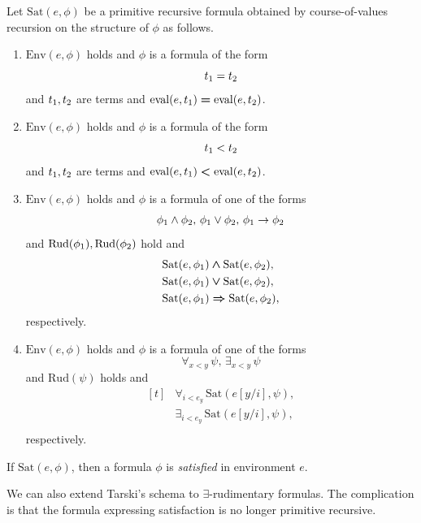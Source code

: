 \documentclass[10pt]{amsart}
\newcommand{\mforall}{\boldsymbol{\forall}}
\newcommand{\mexists}{\boldsymbol{\exists}}
\newcommand{\mra}{\boldsymbol{\Rightarrow}}
\newcommand{\mand}{\boldsymbol{\wedge}}
\newcommand{\mor}{\boldsymbol{\vee}}
\newcommand{\mle}{\boldsymbol{<}}
\newcommand{\meq}{\boldsymbol{=}}
\begin{document}
\begin{definition}
  Let $\mathrm{Sat}(e,\phi)$ be a primitive recursive formula obtained by course-of-values recursion on the structure of $\phi$ as follows.
  \begin{enumerate}[label=\textbf{(\arabic*)}, leftmargin=3.0em]
    \item $\mathrm{Env}(e,\phi)$ holds and $\phi$ is a formula of the form 
      $$t_{\rm{1}} = t_{\rm{2}}$$
      and $t_{\rm{1}},t_{\rm{2}}$ are terms and $\mathrm{eval}(e,t_{\rm{1}}) \meq \mathrm{eval}(e,t_{\rm{2}})$.
    \item $\mathrm{Env}(e,\phi)$ holds and $\phi$ is a formula of the form 
      $$t_{\rm{1}} < t_{\rm{2}}$$
      and $t_{\rm{1}},t_{\rm{2}}$ are terms and $\mathrm{eval}(e,t_{\rm{1}}) \mle \mathrm{eval}(e,t_{\rm{2}})$.
    \item $\mathrm{Env}(e,\phi)$ holds and $\phi$ is a formula of one of the forms
      $$\phi_{\rm{1}} \wedge \phi_{\rm{2}},\,\phi_{\rm{1}} \vee \phi_{\rm{2}},\,\phi_{\rm{1}}\rightarrow \phi_{\rm{2}}$$
      and $\mathrm{Rud}(\phi_{\rm{1}}),\mathrm{Rud}(\phi_{\rm{2}})$ hold and
      $$\begin{aligned}[t]
        &\mathrm{Sat}(e,\phi_{\rm{1}}) \mand \mathrm{Sat}(e,\phi_{\rm{2}}),\\
        &\mathrm{Sat}(e,\phi_{\rm{1}}) \mor \mathrm{Sat}(e,\phi_{\rm{2}}),\\
        &\mathrm{Sat}(e,\phi_{\rm{1}}) \mra \mathrm{Sat}(e,\phi_{\rm{2}}),\\
      \end{aligned}$$
    respectively.
    \item $\mathrm{Env}(e,\phi)$ holds and $\phi$ is a formula of one of the forms
      $$\forall_{x < y}\,\psi,\,\exists_{x < y}\,\psi$$
      and $\mathrm{Rud}(\psi)$ holds and
      $$\begin{aligned}[t]
        &\mforall_{i < e_y}\,\mathrm{Sat}(e[y/i],\psi),\\
        &\mexists_{i < e_y}\,\mathrm{Sat}(e[y/i],\psi),\\
      \end{aligned}$$
      respectively.
 \end{enumerate}
 If $\mathrm{Sat}(e,\phi)$, then a formula $\phi$ is \textit{satisfied} in environment $e$.
\end{definition}
\noindent
We can also extend Tarski's schema to $\mexists$-rudimentary formulas. The complication is that the formula expressing satisfaction is no longer primitive recursive.
\end{document}
